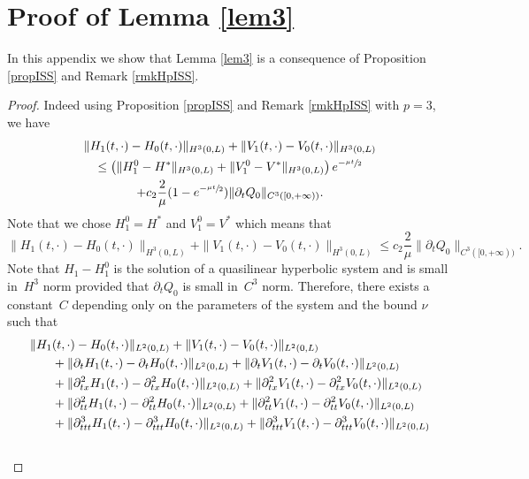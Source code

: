 \documentclass[JEP,XML,SOM,Unicode]{cedram}
\theoremstyle{definition}
\begin{document}
\section{Proof of Lemma \ref{lem3}}\label{app:prooflem3}
In this appendix we show that Lemma \ref{lem3} is a consequence of Proposition \ref{propISS} and Remark \ref{rmkHpISS}.
\begin{proof}
Indeed using Proposition \ref{propISS} and Remark \ref{rmkHpISS} with $p=3$, we have
\begin{multline*}
\|H_{1}(t,\cdot)-H_{0}(t,\cdot)\|_{H^{3}(0,L)}+\|V_{1}(t,\cdot)-V_{0}(t,\cdot)\|_{H^{3}(0,L)}\\
\leq \left(\|H_{1}^{0}-H^{*}\|_{H^{3}(0,L)}+\|V_{1}^{0}-V^{*}\|_{H^{3}(0,L)}\right)e^{-\sfrac{\mu t}{2}}\\
+c_{2} \frac{2}{\mu}(1-e^{-\sfrac{\mu t}{2}}) \|\partial_{t}Q_{0}\|_{C^{3}([0,+\infty))}.
\end{multline*}
Note that we chose $H_{1}^{0} = H^{*}$ and $V_{1}^{0} = V^{*}$ which means that
\begin{equation}\label{estimlemma1}
\|H_{1}(t,\cdot)-H_{0}(t,\cdot)\|_{H^{3}(0,L)}+\|V_{1}(t,\cdot)-V_{0}(t,\cdot)\|_{H^{3}(0,L)}\leq c_{2} \frac{2}{\mu}\|\partial_{t}Q_{0}\|_{C^{3}([0,+\infty))}.
\end{equation}
Note that $H_{1}-H_{1}^{0}$ is the solution of a quasilinear hyperbolic system and is small in~$H^{3}$ norm provided that $\partial_{t}Q_{0}$ is small in~$C^{3}$ norm. Therefore, there exists a constant~$C$ depending only on the parameters of the system and the bound $\nu$ such that
\begin{align}
\label{estimlemma2}
\|H_{1}&(t,\cdot)-H_{0}(t,\cdot)\|_{L^{2}(0,L)}+\|V_{1}(t,\cdot)-V_{0}(t,\cdot)\|_{L^{2}(0,L)}\\\notag
&+\|\partial_{t}H_{1}(t,\cdot)-\partial_{t}H_{0}(t,\cdot)\|_{L^{2}(0,L)}+\|\partial_{t}V_{1}(t,\cdot)-\partial_{t}V_{0}(t,\cdot)\|_{L^{2}(0,L)}\\\notag
&+\|\partial_{tx}^{2}H_{1}(t,\cdot)-\partial_{tx}^{2}H_{0}(t,\cdot)\|_{L^{2}(0,L)}+\|\partial_{tx}^{2}V_{1}(t,\cdot)-\partial_{tx}^{2}V_{0}(t,\cdot)\|_{L^{2}(0,L)}\\\notag
&+\|\partial_{tt}^{2}H_{1}(t,\cdot)-\partial_{tt}^{2}H_{0}(t,\cdot)\|_{L^{2}(0,L)}+\|\partial_{tt}^{2}V_{1}(t,\cdot)-\partial_{tt}^{2}V_{0}(t,\cdot)\|_{L^{2}(0,L)}\\\notag
&+\|\partial_{ttt}^{3}H_{1}(t,\cdot)-\partial_{ttt}^{3}H_{0}(t,\cdot)\|_{L^{2}(0,L)}+\|\partial_{ttt}^{3}V_{1}(t,\cdot)-\partial_{ttt}^{3}V_{0}(t,\cdot)\|_{L^{2}(0,L)}\\\notag

\end{align}
\end{proof}
\end{document}
